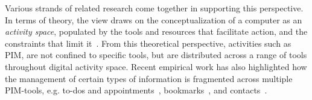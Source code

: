 Various strands of related research come together in supporting this perspective.
In terms of theory, the view draws on the conceptualization of a computer as an \textit{activity space}, populated by the tools and resources that facilitate action, and the constraints that limit it~\citep{dk:01}. From this theoretical perspective, activities such as PIM, are not confined to specific tools, but are distributed across a range of tools throughout digital activity space.
Recent empirical work has also highlighted how the management of certain types of information is fragmented across multiple PIM-tools, e.g. to-dos and appointments~\citep{bg:01,Bellotti:00}, bookmarks~\citep{kftf:01}, and contacts~\citep{Whittaker-contacts:02}.  %


